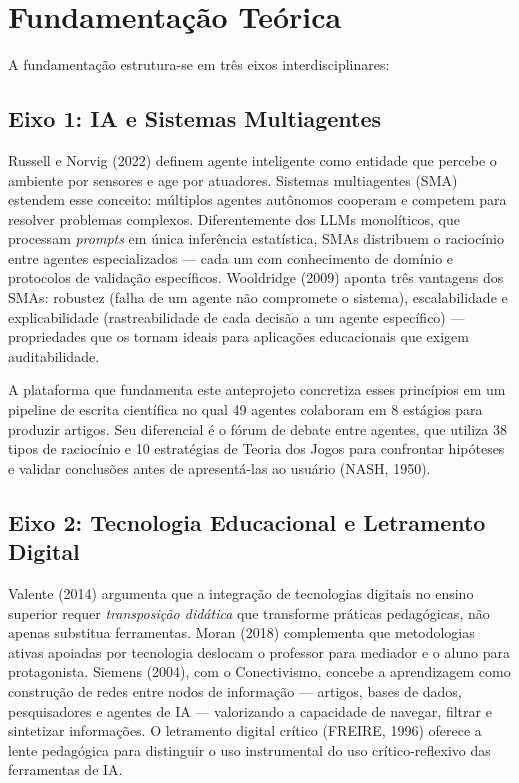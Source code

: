 \documentclass[12pt,a4paper]{article}
\begin{document}
\section{Fundamentação Teórica}

A fundamentação estrutura-se em três eixos interdisciplinares:

\subsection{Eixo 1: IA e Sistemas Multiagentes}

Russell e Norvig (2022) definem agente inteligente como entidade que percebe o ambiente por sensores e age por atuadores. Sistemas multiagentes (SMA) estendem esse conceito: múltiplos agentes autônomos cooperam e competem para resolver problemas complexos. Diferentemente dos LLMs monolíticos, que processam \textit{prompts} em única inferência estatística, SMAs distribuem o raciocínio entre agentes especializados --- cada um com conhecimento de domínio e protocolos de validação específicos. Wooldridge (2009) aponta três vantagens dos SMAs: robustez (falha de um agente não compromete o sistema), escalabilidade e explicabilidade (rastreabilidade de cada decisão a um agente específico) --- propriedades que os tornam ideais para aplicações educacionais que exigem auditabilidade.

A plataforma que fundamenta este anteprojeto concretiza esses princípios em um pipeline de escrita científica no qual 49 agentes colaboram em 8 estágios para produzir artigos. Seu diferencial é o fórum de debate entre agentes, que utiliza 38 tipos de raciocínio e 10 estratégias de Teoria dos Jogos para confrontar hipóteses e validar conclusões antes de apresentá-las ao usuário (NASH, 1950).

\subsection{Eixo 2: Tecnologia Educacional e Letramento Digital}

Valente (2014) argumenta que a integração de tecnologias digitais no ensino superior requer \textit{transposição didática} que transforme práticas pedagógicas, não apenas substitua ferramentas. Moran (2018) complementa que metodologias ativas apoiadas por tecnologia deslocam o professor para mediador e o aluno para protagonista. Siemens (2004), com o Conectivismo, concebe a aprendizagem como construção de redes entre nodos de informação --- artigos, bases de dados, pesquisadores e agentes de IA --- valorizando a capacidade de navegar, filtrar e sintetizar informações. O letramento digital crítico (FREIRE, 1996) oferece a lente pedagógica para distinguir o uso instrumental do uso crítico-reflexivo das ferramentas de IA.
\end{document}
